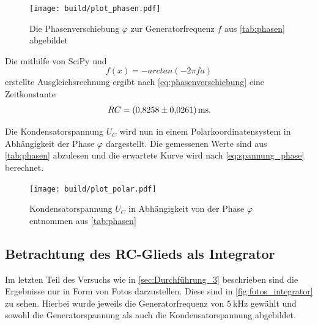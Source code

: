 \begin{figure}
    \centering
    \texttt{[image: build/plot\_phasen.pdf]}
    \caption{Die Phasenverschiebung $\varphi$ zur Generatorfrequenz $f$ aus \autoref{tab:phasen} abgebildet}
    \label{fig:plot_phasen}
\end{figure}

Die mithilfe von SciPy\cite{scipy} und
\begin{equation}
    f(x)=-arctan(-2\pi f a)
\end{equation}
erstellte Ausgleichsrechnung ergibt nach \autoref{eq:phasenverschiebung} eine Zeitkonstante
\begin{equation}
    RC = \SI{0.8258+-0.0261}{\milli\second}.
\end{equation}

Die Kondensatorspannung $U_C$ wird nun in einem Polarkoordinatensystem in Abhängigkeit der Phase $\varphi$ dargestellt. Die gemessenen Werte sind aus \autoref{tab:phasen} abzulesen und die erwartete Kurve wird nach \autoref{eq:spannung_phase} berechnet.

\begin{figure}
    \centering
    \texttt{[image: build/plot\_polar.pdf]}
    \caption{Kondensatorspannung $U_C$ in Abhängigkeit von der Phase $\varphi$ entnommen aus \autoref{tab:phasen}}
    \label{fig:plot_polar}
\end{figure}

\subsection{Betrachtung des RC-Glieds als Integrator}
\label{sec:Auswertung_Integrator}

Im letzten Teil des Versuchs wie in \autoref{sec:Durchführung_3} beschrieben sind die Ergebnisse nur in Form von Fotos darzustellen. Diese sind in \autoref{fig:fotos_integrator} zu sehen. Hierbei wurde jeweils die Generatorfrequenz von $\SI{5}{\kilo\hertz}$ gewählt und sowohl die Generatorspannung als auch die Kondensatorspannung abgebildet.


